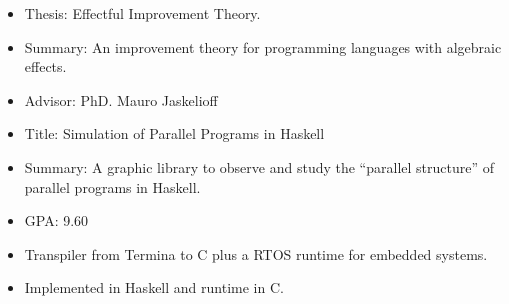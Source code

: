 

\newpage

    \begin{itemize}
        \item Thesis: Effectful Improvement Theory.
        \item Summary: An improvement theory for programming languages with
                algebraic effects.
        \item Advisor: PhD. Mauro Jaskelioff
    \end{itemize}
    \divider

    \begin{itemize}
        \item Title: Simulation of Parallel Programs in Haskell
        \item Summary: A graphic library to observe and study the ``parallel
                structure'' of parallel programs in Haskell.
        \item GPA: 9.60
    \end{itemize}

    \begin{itemize}
        \item Transpiler from Termina to C plus a RTOS runtime for embedded systems.
        \item Implemented in Haskell and runtime in C.
    \end{itemize}
    \divider

